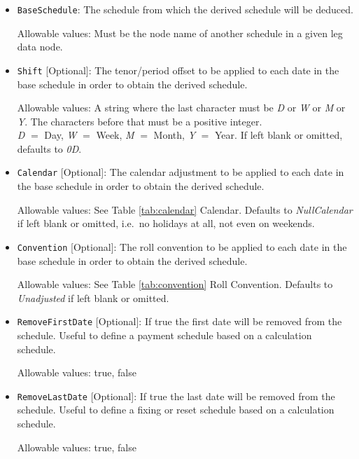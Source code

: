 \begin{itemize}

\item \lstinline!BaseSchedule!: The schedule from which the derived schedule will be deduced.

Allowable values: Must be the node name of another schedule in a given leg data node.

\item \lstinline!Shift! [Optional]: The tenor/period offset to be applied to each date in the base schedule in order to obtain the derived schedule.

Allowable values: A string where the last character must be \emph{D} or \emph{W} or
\emph{M} or \emph{Y}.  The characters before that must be a positive integer. \\ \emph{D}
$=$ Day, \emph{W} $=$ Week, \emph{M} $=$ Month, \emph{Y} $=$ Year. If left blank or omitted, defaults to \emph{0D}.

\item \lstinline!Calendar! [Optional]: The calendar adjustment to be applied to each date in the base schedule in order to obtain the derived schedule.

Allowable values: See Table \ref{tab:calendar} Calendar. Defaults to \emph{NullCalendar} if left blank or omitted, i.e.\ no holidays at all, not even on weekends.

\item \lstinline!Convention! [Optional]: The roll convention to be applied to each date in the base schedule in order to obtain the derived schedule.

Allowable values: See Table \ref{tab:convention} Roll Convention. Defaults to \emph{Unadjusted} if left blank or omitted.

\item \lstinline!RemoveFirstDate! [Optional]: If true the first date will be removed from the schedule. Useful to define a payment schedule based on a calculation schedule.

Allowable values: true, false

\item \lstinline!RemoveLastDate! [Optional]: If true the last date will be removed from the schedule. Useful to define a fixing or reset schedule based on a calculation schedule.

Allowable values: true, false

\end{itemize}
